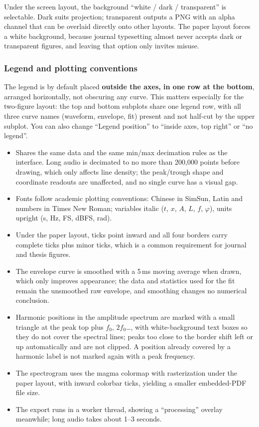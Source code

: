 \documentclass[UTF8,a4paper,12pt]{ctexart}
\begin{document}
Under the screen layout, the background ``white / dark / transparent'' is selectable. Dark suits projection; transparent outputs a PNG with an alpha channel that can be overlaid directly onto other layouts. The paper layout forces a white background, because journal typesetting almost never accepts dark or transparent figures, and leaving that option only invites misuse.

\subsubsection*{Legend and plotting conventions}

The legend is by default placed \textbf{outside the axes, in one row at the bottom}, arranged horizontally, not obscuring any curve. This matters especially for the two-figure layout: the top and bottom subplots share one legend row, with all three curve names (waveform, envelope, fit) present and not half-cut by the upper subplot. You can also change ``Legend position'' to ``inside axes, top right'' or ``no legend''.

\begin{itemize}
  \item Shares the same data and the same min/max decimation rules as the interface. Long audio is decimated to no more than 200{,}000 points before drawing, which only affects line density; the peak/trough shape and coordinate readouts are unaffected, and no single curve has a visual gap.
  \item Fonts follow academic plotting conventions: Chinese in SimSun, Latin and numbers in Times New Roman; variables italic ($t$, $x$, $A$, $L$, $f$, $\varphi$), units upright (s, Hz, FS, dBFS, rad).
  \item Under the paper layout, ticks point inward and all four borders carry complete ticks plus minor ticks, which is a common requirement for journal and thesis figures.
  \item The envelope curve is smoothed with a 5\,ms moving average when drawn, which only improves appearance; the data and statistics used for the fit remain the unsmoothed raw envelope, and smoothing changes no numerical conclusion.
  \item Harmonic positions in the amplitude spectrum are marked with a small triangle at the peak top plus $f_0$, $2f_0$\dots, with white-background text boxes so they do not cover the spectral lines; peaks too close to the border shift left or up automatically and are not clipped. A position already covered by a harmonic label is not marked again with a peak frequency.
  \item The spectrogram uses the magma colormap with rasterization under the paper layout, with inward colorbar ticks, yielding a smaller embedded-PDF file size.
  \item The export runs in a worker thread, showing a ``processing'' overlay meanwhile; long audio takes about 1--3 seconds.
\end{itemize}
\end{document}
